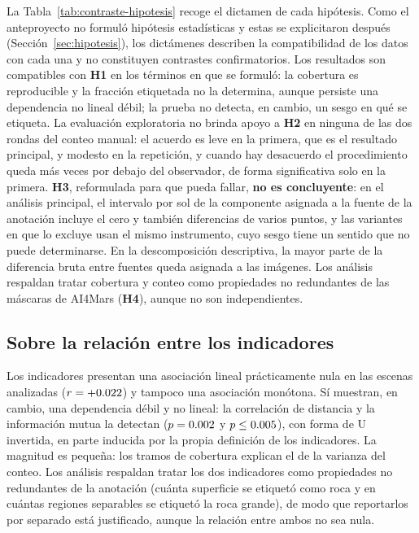 La Tabla~\ref{tab:contraste-hipotesis} recoge el dictamen de cada hipótesis. Como el
anteproyecto no formuló hipótesis estadísticas y estas se explicitaron después
(Sección~\ref{sec:hipotesis}), los dictámenes describen la compatibilidad de los datos con cada
una y no constituyen contrastes confirmatorios. Los resultados son compatibles con \textbf{H1}
en los términos en que se formuló: la cobertura es reproducible y la fracción etiquetada no la
determina, aunque persiste una dependencia no lineal débil; la prueba no detecta, en cambio, un
sesgo en qué se etiqueta. La evaluación exploratoria no brinda apoyo a \textbf{H2} en ninguna de
las dos rondas del conteo manual: el acuerdo es leve en la primera, que es el resultado
principal, y modesto en la repetición, y cuando hay desacuerdo el procedimiento queda más veces
por debajo del observador, de forma significativa solo en la primera. \textbf{H3}, reformulada
para que pueda fallar, \textbf{no es concluyente}: en el análisis principal, el intervalo por sol
de la componente asignada a la fuente de la anotación incluye el cero y también diferencias de
varios puntos, y las variantes en que lo excluye usan el mismo instrumento, cuyo sesgo tiene un
sentido que no puede determinarse. En la descomposición descriptiva, la mayor parte de la
diferencia bruta entre fuentes queda asignada a las imágenes. Los análisis respaldan tratar cobertura y conteo como propiedades no redundantes
de las máscaras de AI4Mars (\textbf{H4}), aunque no son independientes.

\subsection{Sobre la relación entre los indicadores}

Los indicadores presentan una asociación lineal prácticamente nula en las escenas analizadas
($r = +\num{0.022}$) y tampoco una asociación monótona. Sí muestran, en cambio, una
dependencia débil y no lineal: la correlación de distancia y la información mutua la detectan
($p = \num{0.002}$ y $p \leq \num{0.005}$), con forma de U invertida, en parte inducida por la
propia definición de los indicadores. La magnitud es pequeña: los tramos de cobertura explican
el \cEtaConteo{} de la varianza del conteo. Los análisis respaldan tratar los dos indicadores
como propiedades no redundantes de la anotación (cuánta superficie se etiquetó como roca y en
cuántas regiones separables se etiquetó la roca grande), de modo que reportarlos por separado
está justificado, aunque la relación entre ambos no sea nula.

